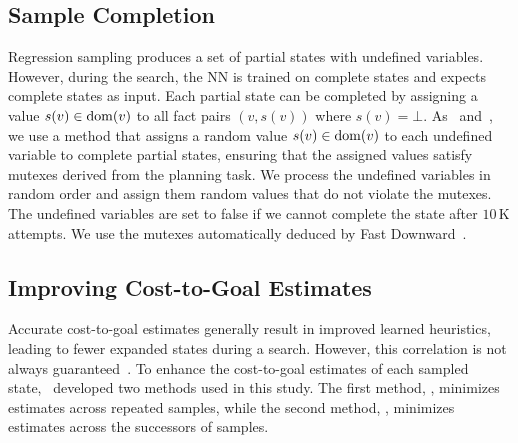 \documentclass[ppgc,diss,english]{iiufrgs}
\begin{document}


\subsection{Sample Completion}
\label{sec:sample-completion}
Regression sampling produces a set of partial states with undefined variables. However, during the search, the NN is trained on complete states and expects complete states as input.
Each partial state can be completed by assigning a value $s(v)\in\operatorname{dom}(v)$ to all fact pairs $(v,s(v))$ where $s(v)=\bot$.
As~\citet{Bettker.etal/2022} and~\citet{Ferber.etal/2022}, we use a method that assigns a random value $s(v) \in \operatorname{dom}(v)$ to each undefined variable to complete partial states, ensuring that the assigned values satisfy mutexes derived from the planning task. We process the undefined variables in random order and assign them random values that do not violate the mutexes. The undefined variables are set to false if we cannot complete the state after $10$\,K attempts. We use the mutexes automatically deduced by Fast Downward~\cite{Helmert/2006,Helmert/2009}.


\subsection{Improving Cost-to-Goal Estimates}
\label{sec:sample-improving-h}
Accurate cost-to-goal estimates generally result in improved learned heuristics, leading to fewer expanded states during a search. However, this correlation is not always guaranteed~\cite{Holte/2010}. To enhance the cost-to-goal estimates of each sampled state,~\citet{Bettker.etal/2022} developed two methods used in this study. The first method, \sai, minimizes estimates across repeated samples, while the second method, \sui, minimizes estimates across the successors of samples.
\end{document}
